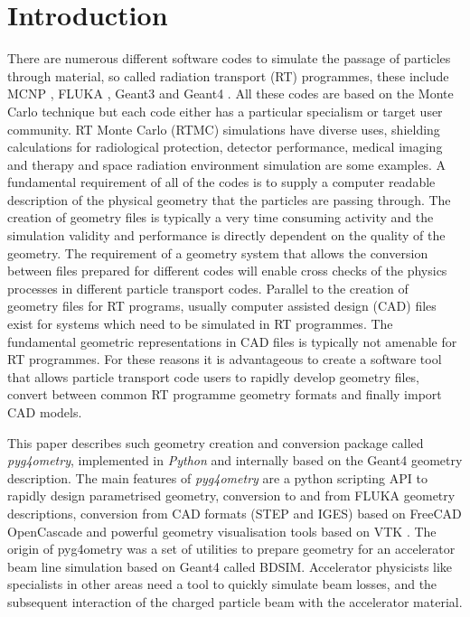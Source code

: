 \documentclass[final,5p,times,twocolumn]{elsarticle}
\begin{document}
\section{Introduction} \label{sec:introduction}
There are numerous different software codes to simulate the passage of particles through material, so called radiation transport (RT) programmes, these 
include MCNP \cite{Mcnp_Werner}, FLUKA \cite{Fluka_Ferrari,Fluka_Bohlen}, Geant3 \cite{Geant3_Brun} and Geant4 \cite{Geant4_Agostinelli}. 
All these codes are based on the Monte Carlo technique but each code either has a particular specialism or target user community.  RT Monte Carlo (RTMC) simulations 
have diverse uses, shielding calculations for radiological protection, detector performance, medical imaging and therapy and space radiation environment 
simulation are some examples. A fundamental requirement of all of the codes is to supply a computer readable description of the physical geometry that 
the particles are passing through.  The creation of geometry files is typically a very time consuming activity and the simulation validity and performance is directly 
dependent on the quality of the geometry. The requirement of a geometry system that allows the conversion between files prepared for different codes will 
enable cross checks of the physics processes in different particle transport codes. Parallel to the creation of geometry files for RT programs, usually computer assisted 
design (CAD) files exist for systems which need to be simulated in RT programmes. The fundamental geometric representations in CAD files is typically not 
amenable for RT programmes.  For these reasons it is advantageous to create a software tool that allows particle transport code users to rapidly develop 
geometry files, convert between common RT programme geometry formats and finally import CAD models. 

This paper describes such geometry creation and conversion package called {\em pyg4ometry}, implemented in {\em Python} and internally based on the Geant4 geometry 
description. The main features of  {\em pyg4ometry} are a python scripting API to rapidly design parametrised geometry, conversion to and from  FLUKA geometry 
descriptions, conversion from CAD formats  (STEP and IGES) based on FreeCAD \cite{FreeCAD} OpenCascade \cite{OpenCASCADE} and powerful geometry 
visualisation tools based on VTK \cite{VTK4}. The origin of pyg4ometry was a set of utilities to prepare geometry for an accelerator beam line simulation based on Geant4 
called BDSIM. Accelerator physicists like specialists in other areas need a tool to quickly simulate beam losses, and the subsequent interaction of the charged particle 
beam with the accelerator material.
\end{document}

